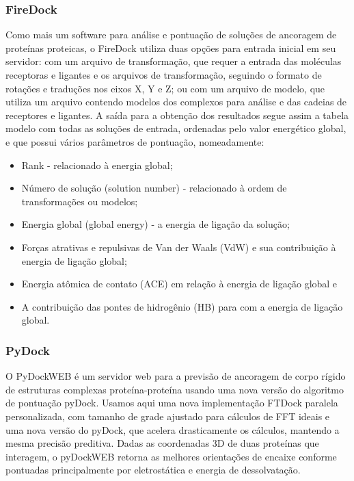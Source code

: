 \documentclass[11pt, letterpaper, portuguese]{article}
\begin{document}
\subsubsection{FireDock}

\par{Como mais um software para análise e pontuação de soluções de ancoragem de proteínas proteicas, o FireDock utiliza duas opções para entrada inicial em seu servidor: com um arquivo de transformação, que requer a entrada das moléculas receptoras e ligantes e os arquivos de transformação, seguindo o formato de rotações e traduções nos eixos X, Y e Z; ou com um arquivo de modelo, que utiliza um arquivo contendo modelos dos complexos para análise e das cadeias de receptores e ligantes. A saída para a obtenção dos resultados segue assim a tabela modelo com todas as soluções de entrada, ordenadas pelo valor energético global, e que possui vários parâmetros de pontuação, nomeadamente:}

\begin{itemize}
    \item Rank -  relacionado à energia global; 
    \item Número de solução (solution number) - relacionado à ordem de transformações ou modelos; 
    \item Energia global (global energy) - a energia de ligação da solução;  
    \item Forças atrativas e repulsivas de Van der Waals (VdW) e sua contribuição à energia de ligação global;
    \item Energia atômica de contato (ACE) em relação à energia de ligação global e 
    \item A contribuição das pontes de hidrogênio (HB) para com a energia de ligação global.
\end{itemize}

    \subsubsection{PyDock}

    \par{O PyDockWEB é um servidor web para a previsão de ancoragem de corpo rígido de estruturas complexas proteína-proteína usando uma nova versão do algoritmo de pontuação pyDock. Usamos aqui uma nova implementação FTDock paralela personalizada, com tamanho de grade ajustado para cálculos de FFT ideais e uma nova versão do pyDock, que acelera drasticamente os cálculos, mantendo a mesma precisão preditiva. Dadas as coordenadas 3D de duas proteínas que interagem, o pyDockWEB retorna as melhores orientações de encaixe conforme pontuadas principalmente por eletrostática e energia de dessolvatação.}
\end{document}
